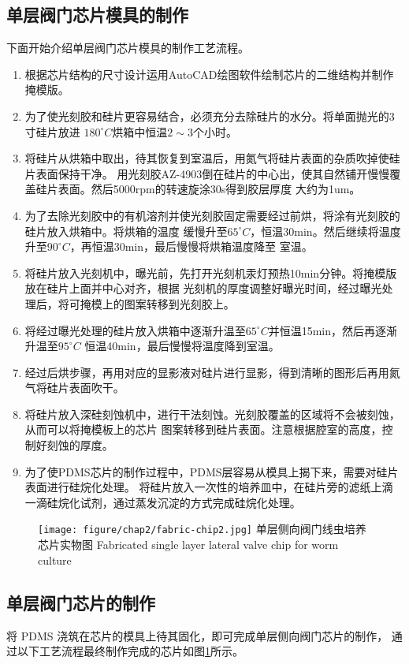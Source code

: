 \subsection{单层阀门芯片模具的制作}
	下面开始介绍单层阀门芯片模具的制作工艺流程。
	\begin{enumerate}[label={(\arabic*)},font={\color{black!50!black}\bfseries}]
	\item 根据芯片结构的尺寸设计运用AutoCAD绘图软件绘制芯片的二维结构并制作掩模版。
	\item 为了使光刻胶和硅片更容易结合，必须充分去除硅片的水分。将单面抛光的3寸硅片放进
	$180^\circ C$烘箱中恒温$2\sim3$个小时。
	\item 将硅片从烘箱中取出，待其恢复到室温后，用氮气将硅片表面的杂质吹掉使硅片表面保持干净。
	用光刻胶AZ-4903倒在硅片的中心出，使其自然铺开慢慢覆盖硅片表面。然后5000rpm的转速旋涂30s得到胶层厚度
	大约为1um。
	\item 为了去除光刻胶中的有机溶剂并使光刻胶固定需要经过前烘，将涂有光刻胶的硅片放入烘箱中。将烘箱的温度
	缓慢升至$65^\circ C$，恒温30min。然后继续将温度升至$90^\circ C$，再恒温30min，最后慢慢将烘箱温度降至
	室温。
	\item 将硅片放入光刻机中，曝光前，先打开光刻机汞灯预热10min分钟。将掩模版放在硅片上面并中心对齐，根据
	光刻机的厚度调整好曝光时间，经过曝光处理后，将可掩模上的图案转移到光刻胶上。
	\item 将经过曝光处理的硅片放入烘箱中逐渐升温至$65^\circ C$并恒温15min，然后再逐渐升温至$95^\circ C$
	恒温40min，最后慢慢将温度降到室温。
	\item 经过后烘步骤，再用对应的显影液对硅片进行显影，得到清晰的图形后再用氮气将硅片表面吹干。
	\item 将硅片放入深硅刻蚀机中，进行干法刻蚀。光刻胶覆盖的区域将不会被刻蚀，从而可以将掩模板上的芯片
	图案转移到硅片表面。注意根据腔室的高度，控制好刻蚀的厚度。
	\item 为了使PDMS芯片的制作过程中，PDMS层容易从模具上揭下来，需要对硅片表面进行硅烷化处理。
	将硅片放入一次性的培养皿中，在硅片旁的滤纸上滴一滴硅烷化试剂，通过蒸发沉淀的方式完成硅烷化处理。
	\end{enumerate}
		\begin{figure}[!tbp]
	  \centering
	  \texttt{[image: figure/chap2/fabric-chip2.jpg]}
	  \bicaption
		{单层侧向阀门线虫培养芯片实物图}
		{Fabricated single layer lateral valve chip for worm culture}
	  \label{fig:chap2:fabricsinglelayer}
	\end{figure}
\subsection{单层阀门芯片的制作}
	将 PDMS 浇筑在芯片的模具上待其固化，即可完成单层侧向阀门芯片的制作，
  通过以下工艺流程最终制作完成的芯片如图\ref{fig:chap2:fabricsinglelayer}所示。

